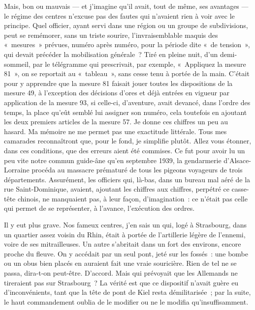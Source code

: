 \documentclass[french,twoside]{book} %
\begin{document}
Mais, bon ou mauvais — et j’imagine qu’il avait, tout de même, ses avantages — le régime des centres n’excuse pas des fautes qui n’avaient rien à voir avec le principe. Quel officier, ayant servi dans une région ou un groupe de subdivisions, peut se remémorer, sans un triste sourire, l’invraisemblable maquis des « mesures » prévues, numéro après numéro, pour la période dite « de tension », qui devait précéder la mobilisation générale ? Tiré en pleine nuit, d’un demi-sommeil, par le télégramme qui prescrivait, par exemple, « Appliquez la mesure 81 », on se reportait au « tableau », sans cesse tenu à portée de la main. C’était pour y apprendre que la mesure 81 faisait jouer toutes les dispositions de la mesure 49, à l’exception des décisions d’ores et déjà entrées en vigueur par application de la mesure 93, si celle-ci, d’aventure, avait devancé, dans l’ordre des temps, la place qu’eût semblé lui assigner son numéro, cela toutefois en ajoutant les deux premiers articles de la mesure 57. Je donne ces chiffres un peu au hasard. Ma mémoire ne me permet pas une exactitude littérale. Tous mes camarades reconnaîtront que, pour le fond, je simplifie plutôt. Allez vous étonner, dans ces conditions, que des erreurs aient été commises. Ce fut pour avoir lu un peu vite notre commun guide-âne qu’en septembre 1939, la gendarmerie d’Alsace-Lorraine procéda au massacre prématuré de tous les pigeons voyageurs de trois départements. Assurément, les officiers qui, là-bas, dans un bureau mal aéré de la rue Saint-Dominique, avaient, ajoutant les chiffres aux chiffres, perpétré ce casse-tête chinois, ne manquaient pas, à leur façon, d’imagination : ce n’était pas celle qui   permet de se représenter, à l’avance, l’exécution des ordres.\par
Il y eut plus grave. Nos fameux centres, j’en sais un qui, logé à Strasbourg, dans un quartier assez voisin du Rhin, était à portée de l’artillerie légère de l’ennemi, voire de ses mitrailleuses. Un autre s’abritait dans un fort des environs, encore proche du fleuve. On y accédait par un seul pont, jeté sur les fossés : une bombe ou un obus bien placés en auraient fait une vraie souricière. Rien de tel ne se passa, dira-t-on peut-être. D’accord. Mais qui prévoyait que les Allemands ne tireraient pas sur Strasbourg ? La vérité est que ce dispositif n’avait guère eu d’inconvénients, tant que la tête de pont de Kiel resta démilitarisée ; par la suite, le haut commandement oublia de le modifier ou ne le modifia qu’insuffisamment.\par
\end{document}
